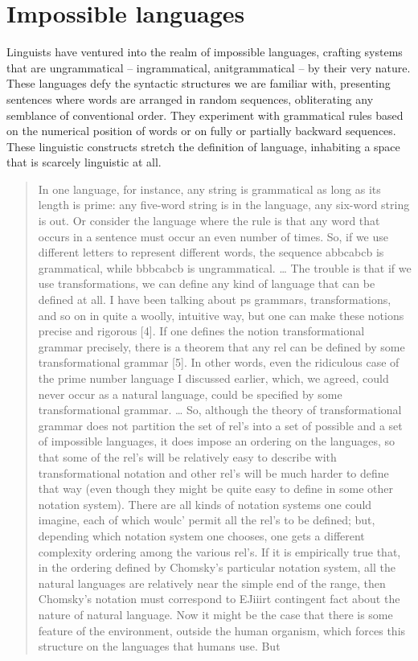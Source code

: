 
\chapter{Impossible languages}

Linguists have ventured into the realm of impossible languages, crafting systems that are ungrammatical -- ingrammatical, anitgrammatical -- by their very nature. These languages defy the syntactic structures we are familiar with, presenting sentences where words are arranged in random sequences, obliterating any semblance of conventional order. They experiment with grammatical rules based on the numerical position of words or on fully or partially backward sequences. These linguistic constructs stretch the definition of language, inhabiting a space that is scarcely linguistic at all.

\begin{quote}
    In one language, for instance, any string is grammatical as long as its length is prime: any five-word string is in the language, any six-word string is out. Or consider the language where the rule is that any word that occurs in a sentence must occur an even number of times. So, if we use different letters to represent different words, the sequence abbcabcb is grammatical, while bbbcabcb is ungrammatical. \hfill\citep[54]{Sampson1975}
    \dots
    The trouble is that if we use transformations, we can define any kind of language that can be defined at all. I have been talking about ps grammars, transformations, and so on in quite a woolly, intuitive way, but one can make these notions precise and rigorous [4]. If one defines the notion transformational grammar precisely, there is a theorem that any rel can be defined by some transformational grammar [5]. In other words, even the ridiculous case of the prime number language I discussed earlier, which, we agreed, could never occur as a natural language, could be specified by some transformational grammar.
    \dots
    So, although the theory of transformational grammar does not partition the set of rel's into a set of possible and a set of impossible languages, it does impose an ordering on the languages, so that some of the rel's will be relatively easy to describe with transformational notation and other rel's will be much harder to define that way (even though they might be quite easy to define in some other notation system). There are all kinds of notation systems one could imagine, each of which woulc' permit all the rel's to be defined; but, depending which notation system one chooses, one gets a different complexity ordering among the various rel's. If it is empirically true that, in the ordering defined by Chomsky's particular notation system, all the natural languages are relatively near the simple end of the range, then Chomsky's notation must correspond to EJiiirt contingent fact about the nature of natural language. Now it might be the case that there is some feature of the environment, outside the human organism, which forces this structure on the languages that humans use. But\hfill\citep[56]{Sampson1975}
\end{quote}

